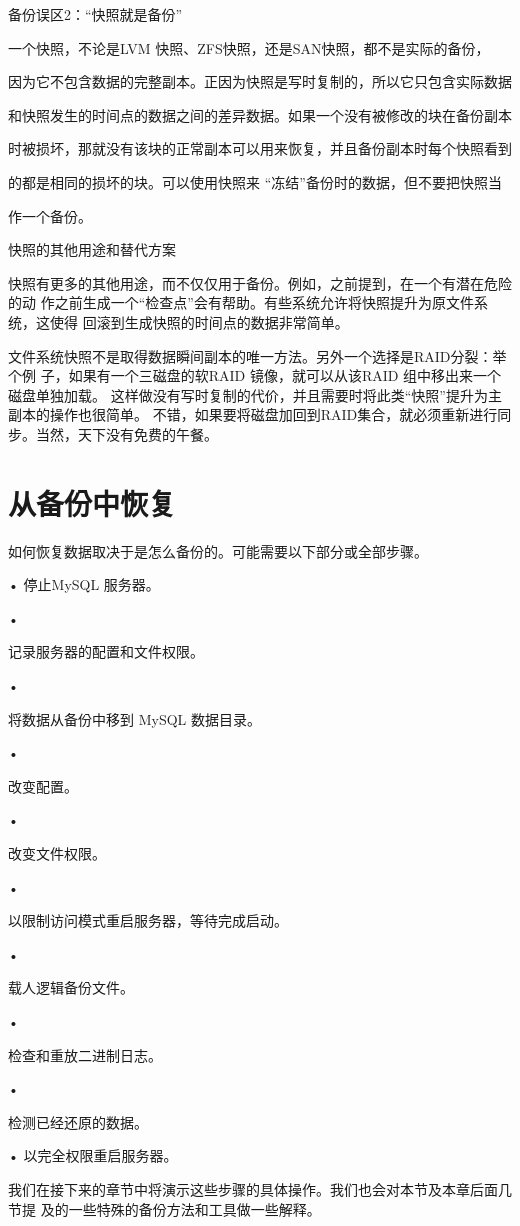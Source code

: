 备份误区2：“快照就是备份”

一个快照，不论是LVM 快照、ZFS快照，还是SAN快照，都不是实际的备份，

因为它不包含数据的完整副本。正因为快照是写时复制的，所以它只包含实际数据

和快照发生的时间点的数据之间的差异数据。如果一个没有被修改的块在备份副本

时被损坏，那就没有该块的正常副本可以用来恢复，并且备份副本时每个快照看到

的都是相同的损坏的块。可以使用快照来 “冻结”备份时的数据，但不要把快照当

作一个备份。

快照的其他用途和替代方案

快照有更多的其他用途，而不仅仅用于备份。例如，之前提到，在一个有潜在危险的动
作之前生成一个“检查点”会有帮助。有些系统允许将快照提升为原文件系统，这使得
回滚到生成快照的时间点的数据非常简单。

文件系统快照不是取得数据瞬间副本的唯一方法。另外一个选择是RAID分裂：举个例
子，如果有一个三磁盘的软RAID 镜像，就可以从该RAID 组中移出来一个磁盘单独加载。
这样做没有写时复制的代价，并且需要时将此类“快照”提升为主副本的操作也很简单。
不错，如果要将磁盘加回到RAID集合，就必须重新进行同步。当然，天下没有免费的午餐。
\section{从备份中恢复}
如何恢复数据取决于是怎么备份的。可能需要以下部分或全部步骤。

• 停止MySQL 服务器。

•

记录服务器的配置和文件权限。

•

将数据从备份中移到 MySQL 数据目录。

•

改变配置。

•

改变文件权限。

•

以限制访问模式重启服务器，等待完成启动。

•

载人逻辑备份文件。

•

检查和重放二进制日志。

•

检测已经还原的数据。

• 以完全权限重启服务器。

我们在接下来的章节中将演示这些步骤的具体操作。我们也会对本节及本章后面几节提
及的一些特殊的备份方法和工具做一些解释。

